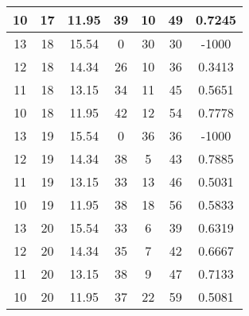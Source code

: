 \documentclass[letterpaper, 12pt]{article}
\begin{document}
\begin{longtable}{|c|c|c|c|c|c|c|}
10 & 17 & 11.95 & 39 & 10 & 49 & 0.7245 \\
\hline
13 & 18 & 15.54 & 0 & 30 & 30 & -1000 \\
\hline
12 & 18 & 14.34 & 26 & 10 & 36 & 0.3413 \\
\hline
11 & 18 & 13.15 & 34 & 11 & 45 & 0.5651 \\
\hline
10 & 18 & 11.95 & 42 & 12 & 54 & 0.7778 \\
\hline
13 & 19 & 15.54 & 0 & 36 & 36 & -1000 \\
\hline
12 & 19 & 14.34 & 38 & 5 & 43 & 0.7885 \\
\hline
11 & 19 & 13.15 & 33 & 13 & 46 & 0.5031 \\
\hline
10 & 19 & 11.95 & 38 & 18 & 56 & 0.5833 \\
\hline
13 & 20 & 15.54 & 33 & 6 & 39 & 0.6319 \\
\hline
12 & 20 & 14.34 & 35 & 7 & 42 & 0.6667 \\
\hline
11 & 20 & 13.15 & 38 & 9 & 47 & 0.7133 \\
\hline
10 & 20 & 11.95 & 37 & 22 & 59 & 0.5081 \\
\hline
\end{longtable}
\end{document}

